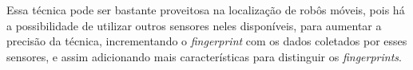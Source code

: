       Essa técnica pode ser bastante proveitosa na localização de robôs móveis, pois há 
      a possibilidade de utilizar outros sensores neles disponíveis, para aumentar a precisão
      da técnica, incrementando o \textit{fingerprint} com os dados coletados por 
      esses sensores, e assim adicionando mais características para distinguir os \textit{fingerprints}.
      

  
